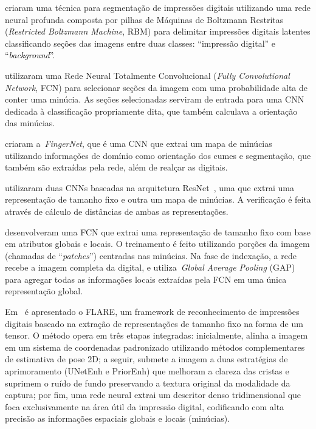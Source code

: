  criaram uma técnica para segmentação de impressões digitais utilizando uma rede neural profunda composta por pilhas de Máquinas de Boltzmann Restritas (\textit{Restricted Boltzmann Machine}, RBM) para delimitar impressões digitais latentes classificando seções das imagens entre duas classes: ``impressão digital'' e ``\textit{background}''. 

 utilizaram uma Rede Neural Totalmente Convolucional (\textit{Fully Convolutional Network}, FCN) para selecionar seções da imagem com uma probabilidade alta de conter uma minúcia. As seções selecionadas serviram de entrada para uma CNN dedicada à classificação propriamente dita, que também calculava a orientação das minúcias.

 criaram a~\textit{FingerNet}, que é uma CNN que extrai um mapa de minúcias utilizando informações de domínio como orientação dos cumes e segmentação, que também são extraídas pela rede, além de realçar as digitais.

 utilizaram duas CNNs baseadas na arquitetura ResNet~\cite{resnet-34}, uma que extrai uma representação de tamanho fixo e outra um mapa de minúcias. A verificação é feita através de cálculo de distâncias de ambas as representações.

 desenvolveram uma FCN que extrai uma representação de tamanho fixo com base em atributos globais e locais. O treinamento é feito utilizando porções da imagem (chamadas de ``\textit{patches}'') centradas nas minúcias. Na fase de indexação, a rede recebe a imagem completa da digital, e utiliza~\textit{Global Average Pooling} (GAP) para agregar todas as informações locais extraídas pela FCN em uma única representação global.

Em~\cite{flare} é apresentado o FLARE, um framework de reconhecimento de impressões digitais baseado na extração de representações de tamanho fixo na forma de um tensor. O método opera em três etapas integradas: inicialmente, alinha a imagem em um sistema de coordenadas padronizado utilizando métodos complementares de estimativa de pose 2D; a seguir, submete a imagem a duas estratégias de aprimoramento (UNetEnh e PriorEnh) que melhoram a clareza das cristas e suprimem o ruído de fundo preservando a textura original da modalidade da captura; por fim, uma rede neural extrai um descritor denso tridimensional que foca exclusivamente na área útil da impressão digital, codificando com alta precisão as informações espaciais globais e locais (minúcias).

